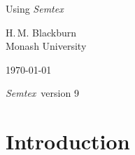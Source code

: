 \documentclass[11pt]{report}
\newcommand{\Semtex}{\emph{Semtex}} \newcommand{\Dog}{\emph{Dog}}
\begin{document}
\begin{titlepage}
\centering

\vspace*{\fill}

{\huge Using \Semtex}

\vspace{\fill}

\begin{figure}[h]
\begin{center}
\end{center}
\end{figure}

\vspace{\fill}

{\large H.\,M. Blackburn}\\
Monash University

\vspace{\fill}

\today

\Semtex\ version 9

\vspace*{\fill}

\end{titlepage}


\tableofcontents

\clearpage

\chapter{Introduction}
\label{ch.intro}
\end{document}
